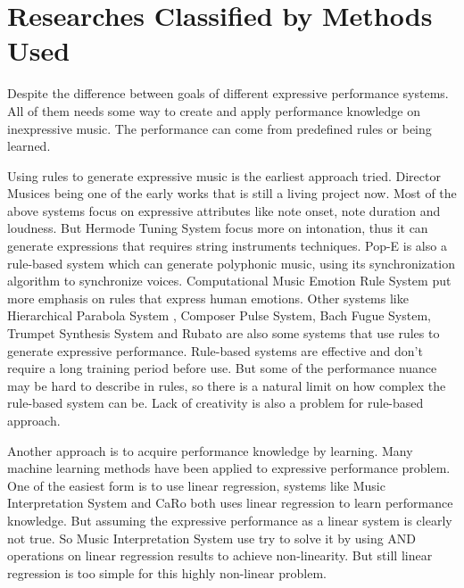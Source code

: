 \section{Researches Classified by Methods Used}
Despite the difference between goals of different expressive performance systems. All of them needs some way to create and apply performance knowledge on inexpressive music. The performance can come from predefined rules or being learned. 

Using rules to generate expressive music is the earliest approach tried. Director Musices \cite{17} being one of the early works that is still a living project now.  Most of the above systems focus on expressive attributes like note onset, note duration and loudness. But Hermode Tuning System \cite{29} focus more on intonation, thus it can generate expressions that requires string instruments techniques. Pop-E \cite{28} is also a rule-based system which can generate polyphonic music, using its synchronization algorithm to synchronize voices. Computational Music Emotion Rule System \cite{31} put more emphasis on rules that express human emotions.  Other systems like Hierarchical Parabola System \cite{17}\cite{18}\cite{19}\cite{20}, Composer Pulse System\cite{21,22}, Bach Fugue System\cite{23}, Trumpet Synthesis System \cite{24, 25} and Rubato \cite{26, 27} are also some systems that use rules to generate expressive performance. Rule-based systems are effective and don't require a long training period before use. But some of the performance nuance may be hard to describe in rules, so there is a natural limit on how complex the rule-based system can be. Lack of creativity is also a problem for rule-based approach.

Another approach is to acquire performance knowledge by learning. Many machine learning methods have been applied to expressive performance problem. One of the easiest form is to use linear regression, systems like Music Interpretation System \cite{32,33,34} and CaRo \cite{35,36,37} both uses linear regression to learn performance knowledge. But assuming the expressive performance as a linear system is clearly not true. So Music Interpretation System use try to solve it by using AND operations on linear regression results to achieve non-linearity. But still linear regression is too simple for this highly non-linear problem.

